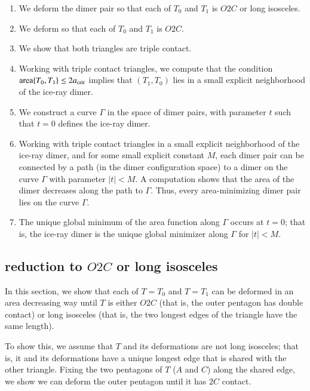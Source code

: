 \begin{enumerate}
\item We deform the dimer pair so that each of $T_0$ and $T_1$ is
  $O2C$ or long isosceles.
\item We deform so that each of $T_0$ and $T_1$ is $O2C$.
\item We show that both triangles are triple contact.
\item Working with triple contact triangles, we compute that the
  condition ${\operatorname{area}}\{T_0,T_1\}\le 2a_\text{crit}$ implies that $(T_1,T_0)$
  lies in a small explicit neighborhood of the ice-ray dimer.
\item We construct a curve $\Gamma$ in the space of dimer pairs, with
  parameter $t$ such that $t=0$ defines the ice-ray dimer.
\item Working with triple contact triangles in a small explicit
  neighborhood of the ice-ray dimer, and for some small explicit
  constant $M$, each dimer pair can be connected by a path (in the
  dimer configuration space) to a dimer on the curve $\Gamma$ with
  parameter $|t|<M$.  A computation shows that the area of the dimer
  decreases along the path to $\Gamma$.  Thus, every area-minimizing
  dimer pair lies on the curve $\Gamma$.
\item The unique global minimum of the area function along $\Gamma$
  occurs at $t=0$; that is, the ice-ray dimer is the unique global
  minimizer along $\Gamma$ for $|t|<M$.
\end{enumerate}

\subsection{reduction to $O2C$ or long isosceles}

In this section, we show that each of $T=T_0$ and $T=T_1$ can be
deformed in an area decreasing way until $T$ is either $O2C$ (that is,
the outer pentagon has double contact) or long isosceles (that is, the
two longest edges of the triangle have the same length).

To show this, we assume that $T$ and its deformations are not long
isosceles; that is, it and its deformations have a unique longest edge
that is shared with the other triangle.  Fixing the two pentagons of
$T$ ($A$ and $C$) along the shared edge, we show we can deform the
outer pentagon until it has $2C$ contact.

